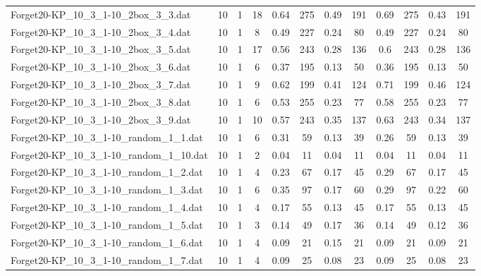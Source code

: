 \begin{sidewaystable}[!ht]
{\begin{tabular}{lccccccccccc}
Forget20-KP\_10\_3\_1-10\_2box\_3\_3.dat & 10 & 1 & 18 & 0.64 & 275 & 0.49 & 191 & 0.69 & 275 &  \textcolor{blue2}{0.43} & 191 \\
Forget20-KP\_10\_3\_1-10\_2box\_3\_4.dat & 10 & 1 & 8 & 0.49 & 227 &  \textcolor{blue2}{0.24} & 80 & 0.49 & 227 &  \textcolor{blue2}{0.24} & 80 \\
Forget20-KP\_10\_3\_1-10\_2box\_3\_5.dat & 10 & 1 & 17 & 0.56 & 243 &  \textcolor{blue2}{0.28} & 136 & 0.6 & 243 &  \textcolor{blue2}{0.28} & 136 \\
Forget20-KP\_10\_3\_1-10\_2box\_3\_6.dat & 10 & 1 & 6 & 0.37 & 195 &  \textcolor{blue2}{0.13} & 50 & 0.36 & 195 &  \textcolor{blue2}{0.13} & 50 \\
Forget20-KP\_10\_3\_1-10\_2box\_3\_7.dat & 10 & 1 & 9 & 0.62 & 199 &  \textcolor{blue2}{0.41} & 124 & 0.71 & 199 & 0.46 & 124 \\
Forget20-KP\_10\_3\_1-10\_2box\_3\_8.dat & 10 & 1 & 6 & 0.53 & 255 &  \textcolor{blue2}{0.23} & 77 & 0.58 & 255 &  \textcolor{blue2}{0.23} & 77 \\
Forget20-KP\_10\_3\_1-10\_2box\_3\_9.dat & 10 & 1 & 10 & 0.57 & 243 & 0.35 & 137 & 0.63 & 243 &  \textcolor{blue2}{0.34} & 137 \\
Forget20-KP\_10\_3\_1-10\_random\_1\_1.dat & 10 & 1 & 6 & 0.31 & 59 &  \textcolor{blue2}{0.13} & 39 & 0.26 & 59 &  \textcolor{blue2}{0.13} & 39 \\
Forget20-KP\_10\_3\_1-10\_random\_1\_10.dat & 10 & 1 & 2 &  \textcolor{blue2}{0.04} & 11 &  \textcolor{blue2}{0.04} & 11 &  \textcolor{blue2}{0.04} & 11 &  \textcolor{blue2}{0.04} & 11 \\
Forget20-KP\_10\_3\_1-10\_random\_1\_2.dat & 10 & 1 & 4 & 0.23 & 67 &  \textcolor{blue2}{0.17} & 45 & 0.29 & 67 &  \textcolor{blue2}{0.17} & 45 \\
Forget20-KP\_10\_3\_1-10\_random\_1\_3.dat & 10 & 1 & 6 & 0.35 & 97 &  \textcolor{blue2}{0.17} & 60 & 0.29 & 97 & 0.22 & 60 \\
Forget20-KP\_10\_3\_1-10\_random\_1\_4.dat & 10 & 1 & 4 & 0.17 & 55 &  \textcolor{blue2}{0.13} & 45 & 0.17 & 55 &  \textcolor{blue2}{0.13} & 45 \\
Forget20-KP\_10\_3\_1-10\_random\_1\_5.dat & 10 & 1 & 3 & 0.14 & 49 & 0.17 & 36 & 0.14 & 49 &  \textcolor{blue2}{0.12} & 36 \\
Forget20-KP\_10\_3\_1-10\_random\_1\_6.dat & 10 & 1 & 4 &  \textcolor{blue2}{0.09} & 21 & 0.15 & 21 &  \textcolor{blue2}{0.09} & 21 &  \textcolor{blue2}{0.09} & 21 \\
Forget20-KP\_10\_3\_1-10\_random\_1\_7.dat & 10 & 1 & 4 & 0.09 & 25 &  \textcolor{blue2}{0.08} & 23 & 0.09 & 25 &  \textcolor{blue2}{0.08} & 23 \\

\end{tabular}}
\end{sidewaystable}
